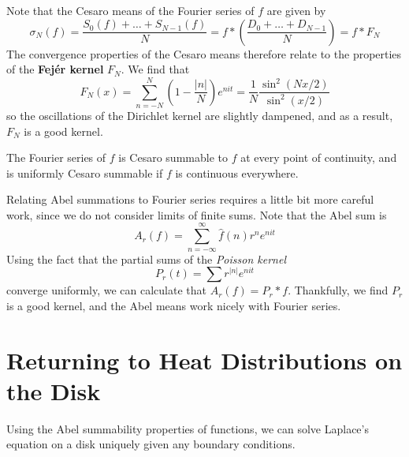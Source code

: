 Note that the Cesaro means of the Fourier series of $f$ are given by
%
\[ \sigma_N(f) = \frac{S_0(f) + \dots + S_{N-1}(f)}{N} = f * \left( \frac{D_0 + \dots + D_{N-1}}{N} \right) = f * F_N \]
%
The convergence properties of the Cesaro means therefore relate to the properties of the {\bf Fej\'{e}r kernel} $F_N$. We find that
%
\[ F_N(x) = \sum_{n = -N}^N \left( 1 - \frac{|n|}{N} \right) e^{nit} = \frac{1}{N} \frac{\sin^2(Nx/2)}{\sin^2(x/2)} \]
%
so the oscillations of the Dirichlet kernel are slightly dampened, and as a result, $F_N$ is a good kernel.

\begin{theorem}
    The Fourier series of $f$ is Cesaro summable to $f$ at every point of continuity, and is uniformly Cesaro summable if $f$ is continuous everywhere.
\end{theorem}

Relating Abel summations to Fourier series requires a little bit more careful work, since we do not consider limits of finite sums. Note that the Abel sum is
%
\[ A_r(f) = \sum_{n = -\infty}^\infty \widehat{f}(n) r^n e^{nit} \]
%
Using the fact that the partial sums of the {\it Poisson kernel}
%
\[ P_r(t) = \sum r^{|n|} e^{nit} \]
%
converge uniformly, we can calculate that $A_r(f) = P_r * f$. Thankfully, we find $P_r$ is a good kernel, and the Abel means work nicely with Fourier series.

\section{Returning to Heat Distributions on the Disk}

Using the Abel summability properties of functions, we can solve Laplace's equation on a disk uniquely given any boundary conditions.

